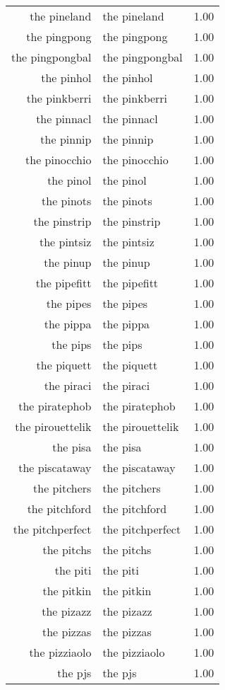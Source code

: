 \begin{table}[ht]
\begin{tabular}{rlr}
  the pineland & the pineland & 1.00 \\ 
  the pingpong & the pingpong & 1.00 \\ 
  the pingpongbal & the pingpongbal & 1.00 \\ 
  the pinhol & the pinhol & 1.00 \\ 
  the pinkberri & the pinkberri & 1.00 \\ 
  the pinnacl & the pinnacl & 1.00 \\ 
  the pinnip & the pinnip & 1.00 \\ 
  the pinocchio & the pinocchio & 1.00 \\ 
  the pinol & the pinol & 1.00 \\ 
  the pinots & the pinots & 1.00 \\ 
  the pinstrip & the pinstrip & 1.00 \\ 
  the pintsiz & the pintsiz & 1.00 \\ 
  the pinup & the pinup & 1.00 \\ 
  the pipefitt & the pipefitt & 1.00 \\ 
  the pipes & the pipes & 1.00 \\ 
  the pippa & the pippa & 1.00 \\ 
  the pips & the pips & 1.00 \\ 
  the piquett & the piquett & 1.00 \\ 
  the piraci & the piraci & 1.00 \\ 
  the piratephob & the piratephob & 1.00 \\ 
  the pirouettelik & the pirouettelik & 1.00 \\ 
  the pisa & the pisa & 1.00 \\ 
  the piscataway & the piscataway & 1.00 \\ 
  the pitchers & the pitchers & 1.00 \\ 
  the pitchford & the pitchford & 1.00 \\ 
  the pitchperfect & the pitchperfect & 1.00 \\ 
  the pitchs & the pitchs & 1.00 \\ 
  the piti & the piti & 1.00 \\ 
  the pitkin & the pitkin & 1.00 \\ 
  the pizazz & the pizazz & 1.00 \\ 
  the pizzas & the pizzas & 1.00 \\ 
  the pizziaolo & the pizziaolo & 1.00 \\ 
  the pjs & the pjs & 1.00 \\ 

\end{tabular}
\end{table}
